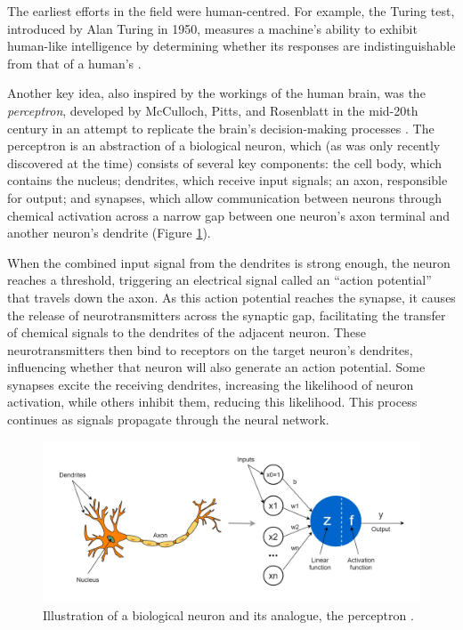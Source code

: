 The earliest efforts in the field were human-centred. For example, the Turing test, introduced by Alan Turing in 1950, measures a machine’s ability to exhibit human-like intelligence by determining whether its responses are indistinguishable from that of a human’s \cite{turing_computing_1950}. 

Another key idea, also inspired by the workings of the human brain, was the \textit{perceptron}, developed by McCulloch, Pitts, and Rosenblatt in the mid-20th century in an attempt to replicate the brain's decision-making processes \cite{mcculloch_logical_1943, rosenblatt_perceptron_1958}. The perceptron is an abstraction of a biological neuron, which (as was only recently discovered at the time) consists of several key components: the cell body, which contains the nucleus; dendrites, which receive input signals; an axon, responsible for output; and synapses, which allow communication between neurons through chemical activation across a narrow gap between one neuron's axon terminal and another neuron's dendrite (Figure \ref{fig:biological-neuron}). 

When the combined input signal from the dendrites is strong enough, the neuron reaches a threshold, triggering an electrical signal called an ``action potential'' that travels down the axon. As this action potential reaches the synapse, it causes the release of neurotransmitters across the synaptic gap, facilitating the transfer of chemical signals to the dendrites of the adjacent neuron. These neurotransmitters then bind to receptors on the target neuron's dendrites, influencing whether that neuron will also generate an action potential. Some synapses excite the receiving dendrites, increasing the likelihood of neuron activation, while others inhibit them, reducing this likelihood. This process continues as signals propagate through the neural network.

\begin{figure}[htbp]
    \centering
    \includegraphics[width=\textwidth]{img/ch1/neuron.png}
    \caption{Illustration of a biological neuron and its analogue, the perceptron \cite{pramoditha_concept_2021}.}
    \label{fig:biological-neuron}
\end{figure}

